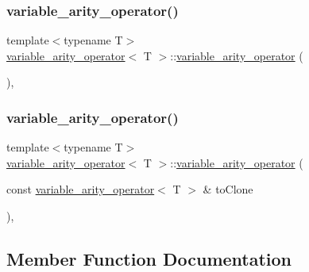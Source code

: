 \subsubsection{\texorpdfstring{variable\_arity\_operator()}{variable\_arity\_operator()}\hspace{0.1cm}{\footnotesize\ttfamily [1/2]}}
{\footnotesize\ttfamily template$<$typename T$>$ \\
\mbox{\hyperlink{classvariable__arity__operator}{variable\+\_\+arity\+\_\+operator}}$<$ T $>$\+::\mbox{\hyperlink{classvariable__arity__operator}{variable\+\_\+arity\+\_\+operator}} (\begin{DoxyParamCaption}{ }\end{DoxyParamCaption})\hspace{0.3cm}{\ttfamily [inline]}, {\ttfamily [protected]}}

\mbox{\label{classvariable__arity__operator_a634c5fc7b2ef20999ee8763ae4801b53}} 
\subsubsection{\texorpdfstring{variable\_arity\_operator()}{variable\_arity\_operator()}\hspace{0.1cm}{\footnotesize\ttfamily [2/2]}}
{\footnotesize\ttfamily template$<$typename T$>$ \\
\mbox{\hyperlink{classvariable__arity__operator}{variable\+\_\+arity\+\_\+operator}}$<$ T $>$\+::\mbox{\hyperlink{classvariable__arity__operator}{variable\+\_\+arity\+\_\+operator}} (\begin{DoxyParamCaption}\item[{const \mbox{\hyperlink{classvariable__arity__operator}{variable\+\_\+arity\+\_\+operator}}$<$ T $>$ \&}]{to\+Clone }\end{DoxyParamCaption})\hspace{0.3cm}{\ttfamily [inline]}, {\ttfamily [protected]}}



\subsection{Member Function Documentation}
\mbox{\label{classvariable__arity__operator_a8ac51b2911c51f9cde1b8b8f8aa101b5}} 
